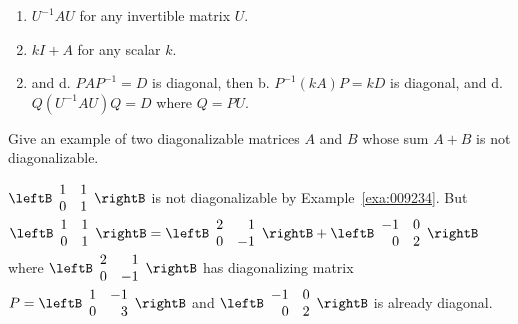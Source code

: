 \begin{multicols}{2}
\begin{ex}
\begin{enumerate}[label={\alph*.}]
\item $U^{-1}AU$ for any invertible matrix $U$.

\item $kI + A$ for any scalar $k$.

\end{enumerate}
\begin{sol}
\begin{enumerate}[label={\alph*.}]
\setcounter{enumi}{1}
\item  and d. $PAP^{-1} = D$ is diagonal, then b. $P^{-1}(kA)P = kD$ is diagonal, and  d. $Q(U^{-1}AU)Q = D$ where $Q = PU$.

\end{enumerate}
\end{sol}
\end{ex}

\begin{ex}
Give an example of two diagonalizable matrices $A$ and $B$ whose sum $A + B$ is not diagonalizable.

\begin{sol}
$\leftB \begin{array}{cc}
1 & 1 \\
0 & 1 
\end{array}\rightB$
 is not diagonalizable by Example~\ref{exa:009234}. But $\leftB \begin{array}{rr}
1 & 1 \\
0 & 1 
\end{array}\rightB = \leftB \begin{array}{rr}
2 & 1 \\
0 & -1 
\end{array}\rightB + \leftB \begin{array}{rr}
-1 & 0 \\
0 & 2 
\end{array}\rightB$
 where $\leftB \begin{array}{rr} 
2 & 1 \\
0 & -1 
\end{array}\rightB$  has diagonalizing matrix $P = \leftB \begin{array}{rr}
1 & -1 \\
0 & 3 
\end{array}\rightB$
 and $\leftB \begin{array}{rr}
-1 & 0 \\
0 & 2 
\end{array}\rightB$
 is already diagonal.
\end{sol}
\end{ex}


\end{multicols}
